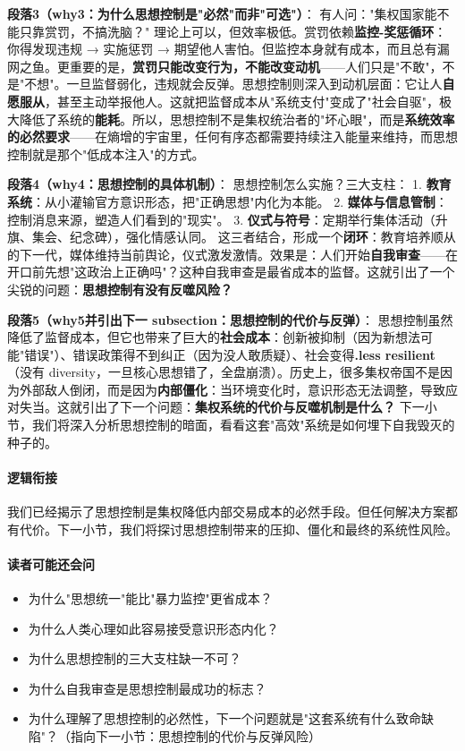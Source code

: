 \documentclass[../main.tex]{subfiles}
\begin{document}
	\textbf{段落3（why3：为什么思想控制是"必然"而非"可选"）}：  
	有人问："集权国家能不能只靠赏罚，不搞洗脑？" 理论上可以，但效率极低。赏罚依赖\textbf{监控-奖惩循环}：你得发现违规 → 实施惩罚 → 期望他人害怕。但监控本身就有成本，而且总有漏网之鱼。更重要的是，\textbf{赏罚只能改变行为，不能改变动机}——人们只是"不敢"，不是"不想"。一旦监督弱化，违规就会反弹。思想控制则深入到动机层面：它让人\textbf{自愿服从}，甚至主动举报他人。这就把监督成本从"系统支付"变成了"社会自驱"，极大降低了系统的\textbf{能耗}。所以，思想控制不是集权统治者的"坏心眼"，而是\textbf{系统效率的必然要求}——在熵增的宇宙里，任何有序态都需要持续注入能量来维持，而思想控制就是那个"低成本注入"的方式。
	
	\textbf{段落4（why4：思想控制的具体机制）}：  
	思想控制怎么实施？三大支柱：  
    1. \textbf{教育系统}：从小灌输官方意识形态，把"正确思想"内化为本能。
    2. \textbf{媒体与信息管制}：控制消息来源，塑造人们看到的"现实"。  
    3. \textbf{仪式与符号}：定期举行集体活动（升旗、集会、纪念碑），强化情感认同。  
    这三者结合，形成一个\textbf{闭环}：教育培养顺从的下一代，媒体维持当前舆论，仪式激发激情。效果是：人们开始\textbf{自我审查}——在开口前先想"这政治上正确吗"？这种自我审查是最省成本的监督。这就引出了一个尖锐的问题：\textbf{思想控制有没有反噬风险？}
	
	\textbf{段落5（why5并引出下一 subsection：思想控制的代价与反弹）}：  
	思想控制虽然降低了监督成本，但它也带来了巨大的\textbf{社会成本}：创新被抑制（因为新想法可能"错误"）、错误政策得不到纠正（因为没人敢质疑）、社会变得\textbf{.less resilient}（没有 diversity，一旦核心思想错了，全盘崩溃）。历史上，很多集权帝国不是因为外部敌人倒闭，而是因为\textbf{内部僵化}：当环境变化时，意识形态无法调整，导致应对失当。这就引出了下一个问题：\textbf{集权系统的代价与反噬机制是什么？} 下一小节，我们将深入分析思想控制的暗面，看看这套"高效"系统是如何埋下自我毁灭的种子的。
	
	\paragraph*{逻辑衔接}
	我们已经揭示了思想控制是集权降低内部交易成本的必然手段。但任何解决方案都有代价。下一小节，我们将探讨思想控制带来的压抑、僵化和最终的系统性风险。
	
	\paragraph*{读者可能还会问}
	\begin{itemize}
\item 为什么"思想统一"能比"暴力监控"更省成本？
	\item 为什么人类心理如此容易接受意识形态内化？
	\item 为什么思想控制的三大支柱缺一不可？
	\item 为什么自我审查是思想控制最成功的标志？
	\item 为什么理解了思想控制的必然性，下一个问题就是"这套系统有什么致命缺陷"？（指向下一小节：思想控制的代价与反弹风险）
\end{itemize}
	
\end{document}
